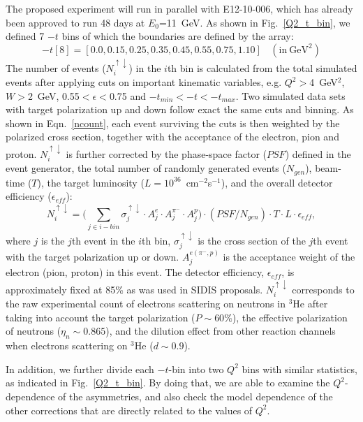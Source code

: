 The proposed experiment will run in parallel with E12-10-006, which has already
been approved to run 48 days at $E_{0}$=11~GeV.  As shown in
Fig.~\ref{Q2_t_bin}, we defined 7 $-t$ bins of which the boundaries are
defined by the array:
 \begin{equation}
-t[8] = [0.0, 0.15, 0.25, 0.35, 0.45, 0.55, 0.75, 1.10]~~~~(\mathrm{in~GeV^{2}})
 \end{equation}
The number of events ($N^{\uparrow\downarrow}_{i}$) in the $i$th bin is
calculated from the total simulated events after applying cuts on important
kinematic variables, e.g. $Q^{2}>$4~GeV$^{2}$, $W>$2~GeV, 0.55$<\epsilon<$0.75
and $-t_{min}<-t<-t_{max}$. Two simulated data sets with target polarization up
and down follow exact the same cuts and binning.  As shown in
Eqn.~\ref{ncount}, each event surviving the cuts is then weighted by the
polarized cross section, together with the acceptance of the electron, pion and
proton. $N^{\uparrow\downarrow}_{i}$ is further corrected by the phase-space
factor ($PSF$) defined in the event generator, the total number of randomly
generated events ($N_{gen}$), beam-time ($T$), the target luminosity
($L=10^{36}$~cm$^{-2}$s$^{-1}$), and the overall detector efficiency
($\epsilon_{eff}$):
 \begin{equation}
     N^{\uparrow\downarrow}_{i} = \bigl(\sum_{j\in i-bin}
     \sigma^{\uparrow\downarrow}_{j}\cdot A^{e}_{j} \cdot
     A^{\pi^{-}}_{j} \cdot A^{p}_{j}\bigr) \cdot (PSF/N_{gen}) \cdot T \cdot L
     \cdot \epsilon_{eff},
     \label{ncount}
 \end{equation}
where $j$ is the $j$th event in the $i$th bin,
$\sigma^{\uparrow\downarrow}_{j}$ is the cross section of the $j$th event with
the target polarization up or down. $A^{e(\pi^{-},p)}_{j}$ is the acceptance
weight of the electron (pion, proton) in this event. The detector efficiency,
$\epsilon_{eff}$, is approximately fixed at 85\% as was used in SIDIS
proposals. $N^{\uparrow\downarrow}_{i}$ corresponds to the raw experimental
count of electrons scattering on neutrons in $\mathrm{^{3}He}$ after taking
into account the target polarization ($P\sim60\%$), the effective polarization
of neutrons ($\eta_{n}\sim0.865$), and the dilution effect from other reaction
channels when electrons scattering on $\mathrm{^{3}He}$ ($d \sim 0.9$).

In addition, we further divide each $-t$-bin into two $Q^{2}$ bins with similar
statistics, as indicated in Fig.~\ref{Q2_t_bin}.  By doing that, we are able to
examine the $Q^{2}$-dependence of the asymmetries, and also check the model
dependence of the other corrections that are directly related to the values of
$Q^{2}$.

